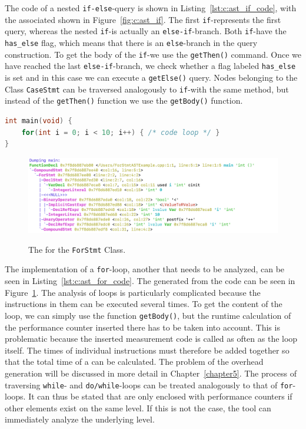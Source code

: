 The code of a nested \lstinline{if-else}-query is shown in Listing~\ref{lst:c:ast_if_code}, with the associated \astsmall shown in Figure~\ref{fig:c:ast_if}. The first \lstinline{if}-\STAT represents the first query, whereas the nested \lstinline{if}-\STAT is actually an \lstinline{else-if}-branch. Both \lstinline{if}-\STATS have the \lstinline{has_else} flag, which means that there is an \lstinline{else}-branch in the query construction. To get the body of the \lstinline{if}-\STAT we use the \lstinline{getThen()} command. Once we have reached the last \lstinline{else-if}-branch, we check whether a flag labeled \lstinline{has_else} is set and in this case we can execute a \lstinline{getElse()} query. Nodes belonging to the Class \lstinline{CaseStmt} can be traversed analogously to \lstinline{if}-\STATS with the same method, but instead of the \lstinline{getThen()} function we use the \lstinline{getBody()} function.

\begin{lstlisting}[float, language=C++, caption=Example Code Showing the Definition of a Loop., label=lst:c:ast_for_code]
int main(void) {
    for(int i = 0; i < 10; i++) { /* code loop */ }
}
\end{lstlisting}

\begin{figure}[t]
    \centering
    \caption{The \AST for the \lstinline{ForStmt} Class.}
    \includegraphics[width=\textwidth]{graphics/c_ast_for.png}
    \label{fig:c:ast_for}
\end{figure}

The implementation of a \lstinline{for}-loop, another \PARSTA that needs to be analyzed, can be seen in Listing~\ref{lst:c:ast_for_code}. The \astsmall generated from the code can be seen in Figure~\ref{fig:c:ast_for}. The analysis of loops is particularly complicated because the instructions in them can be executed several times. To get the content of the loop, we can simply use the function \lstinline{getBody()}, but the runtime calculation of the performance counter inserted there has to be taken into account. This is problematic because the inserted measurement code is called as often as the loop itself. The times of individual instructions must therefore be added together so that the total time of a \STAT can be calculated. The problem of the overhead generation will be discussed in more detail in Chapter~\ref{chapter5}. The process of traversing \lstinline{while}- and \lstinline{do/while}-loops can be treated analogously to that of \lstinline{for}-loops. It can thus be stated that \PARSTAS are only enclosed with performance counters if other elements exist on the same level. If this is not the case, the tool can immediately analyze the underlying level.

